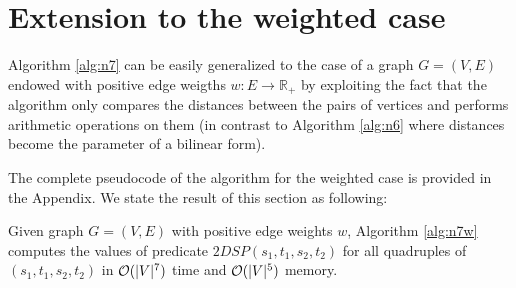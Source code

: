 \section{Extension to the weighted case}

Algorithm \ref{alg:n7} can be easily generalized to the case of a graph $G = (V, E)$ endowed with positive edge weigths $w : E \rightarrow \mathbb{R}_+$ by exploiting the fact that the algorithm only compares the distances between the pairs of vertices and performs arithmetic operations on them (in contrast to Algorithm \ref{alg:n6} where distances become the parameter of a bilinear form).

The complete pseudocode of the algorithm for the weighted case is provided in the Appendix. We state  the result of this section as following:

\begin{theorem}
Given graph $G = (V, E)$ with positive edge weights $w$, Algorithm \ref{alg:n7w} computes the values of predicate $2DSP(s_1, t_1, s_2, t_2)$ for all quadruples of $(s_1, t_1, s_2, t_2)$ in $\mathcal{O}(|V|^7)$ time and $\mathcal{O}(|V|^5)$ memory. 
\end{theorem}
